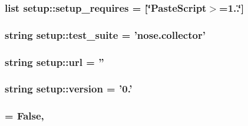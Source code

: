\hypertarget{namespacesetup_a4cbca0f0be6073ce5c6dbbebeaa76ecf}{
\subsubsection[{setup\-\_\-requires}]{\setlength{\rightskip}{0pt plus 5cm}list {\bf setup\-::setup\-\_\-requires} = \mbox{[}\char`\"{}\-Paste\-Script$>$=1..\char`\"{}\mbox{]}}}\label{namespacesetup_a4cbca0f0be6073ce5c6dbbebeaa76ecf}
\hypertarget{namespacesetup_a0e55c2e28d112353d7b057e7ca1374a9}{
\subsubsection[{test\-\_\-suite}]{\setlength{\rightskip}{0pt plus 5cm}string {\bf setup\-::test\-\_\-suite} = 'nose.\-collector'}}\label{namespacesetup_a0e55c2e28d112353d7b057e7ca1374a9}
\hypertarget{namespacesetup_a7c3763764f99123690822c047e74c36e}{
\subsubsection[{url}]{\setlength{\rightskip}{0pt plus 5cm}string {\bf setup\-::url} = ''}}\label{namespacesetup_a7c3763764f99123690822c047e74c36e}
\hypertarget{namespacesetup_a8b86ddd5b5591d99de08e584197a53d9}{
\subsubsection[{version}]{\setlength{\rightskip}{0pt plus 5cm}string {\bf setup\-::version} = '0.'}}\label{namespacesetup_a8b86ddd5b5591d99de08e584197a53d9}
\hypertarget{namespacesetup_a57f4177a567efe80153e32033b6cca09}{
\subsubsection[{zip\-\_\-safe}]{ = \-False,}}\label{namespacesetup_a57f4177a567efe80153e32033b6cca09}
